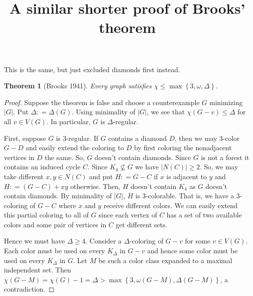 \documentclass[12pt]{amsart}
\title{A similar shorter proof of Brooks' theorem}
\theoremstyle{plain}
\newtheorem{thm}{Theorem}
\theoremstyle{definition}
\theoremstyle{remark}
\newcommand{\set}[1]{\left\{ #1 \right\}}
\newcommand{\card}[1]{\left|#1\right|}
\newcommand{\DefinedAs}{\mathrel{\mathop:}=}
\begin{document}
\maketitle

\noindent This is the same, but just excluded diamonds first instead.

\begin{thm}[Brooks 1941]
Every graph satisfies $\chi \leq \max\set{3, \omega, \Delta}$.
\end{thm}
\begin{proof}
Suppose the theorem is false and choose a counterexample $G$ minimizing
$\card{G}$.  Put $\Delta \DefinedAs \Delta(G)$. Using minimality of $\card{G}$,
we see that $\chi(G - v) \leq \Delta$ for all $v \in
V(G)$. In particular, $G$ is $\Delta$-regular.

First, suppose $G$ is $3$-regular.  If $G$ contains a diamond $D$, then we may $3$-color $G-D$ and easily extend the coloring to $D$ by first coloring the nonadjacent vertices in $D$ the same.  So, $G$ doesn't contain diamonds. Since $G$ is not a forest it contains an induced cycle $C$. Since $K_4 \not
\subseteq G$ we have $\card{N(C)} \geq 2$. So, we may take different $x, y \in N(C)$ and put $H \DefinedAs G - C$ if $x$ is adjacent to $y$ and $H \DefinedAs (G-C) + xy$ otherwise.  Then, $H$ doesn't contain $K_4$ as $G$ doesn't contain diamonds. By minimality of $\card{G}$, $H$ is $3$-colorable. That is, we have a $3$-coloring of $G - C$ where $x$ and $y$ receive different colors.  We can easily extend this partial
coloring to all of $G$ since each vertex of $C$ has a set of two available
colors and some pair of vertices in $C$ get different sets.  

Hence we must have $\Delta \geq 4$. Consider a $\Delta$-coloring of $G-v$ for some $v \in V(G)$.  Each color must be used on every $K_{\Delta}$ in $G-v$ and hence some color must be used on every $K_{\Delta}$ in $G$.  Let $M$ be such a color class expanded to a maximal independent set.  Then $\chi(G-M) = \chi(G) - 1 = \Delta > \max\set{3, \omega(G-M), \Delta(G-M)}$, a contradiction.
\end{proof}
\end{document}

